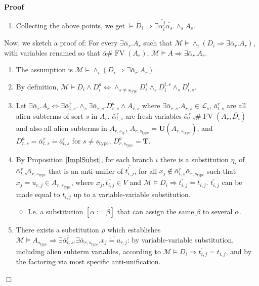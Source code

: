 \documentclass{article}
\newcommand{\assign}{:=}
\newcommand{\nin}{\not\in}
\newcommand{\tmmathbf}[1]{\ensuremath{\boldsymbol{#1}}}
\newcommand{\tmop}[1]{\ensuremath{\operatorname{#1}}}
\newenvironment{proof}{\noindent\textbf{Proof\ }}{\hspace*{\fill}$\Box$\medskip}
\begin{document}
\begin{proof}
\begin{enumerate}
    \item Collecting the above points, we get $\vDash D_i \Rightarrow \exists
    \overline{\alpha^j_i} \overline{\bar{\alpha}_s} . \wedge_s A_s$.
  \end{enumerate}
  Now, we sketch a proof of: For every $\exists \bar{\alpha}_r .A_r$ such that
  $\mathcal{M} \vDash \wedge_i (D_i \Rightarrow \exists \bar{\alpha}_r .A_r)$,
  with variables renamed so that $\bar{\alpha} \# \tmop{FV} (A_r)$,
  $\mathcal{M} \vDash A \Rightarrow \exists \bar{\alpha}_r .A_r$.
  \begin{enumerate}
    \item The assumption is $\mathcal{M} \vDash \wedge_i (D_i \Rightarrow
    \exists \bar{\alpha}_r .A_r)$.
    
    \item By definition, $\mathcal{M} \vDash D_i \wedge D_i^a \Leftrightarrow
    \wedge_{s \neq s_{\tmop{type}}} D_i^s \wedge_s D_i^{t, s} \wedge_s D^t_{i,
    s}$.
    
    \item Let $\exists \bar{\alpha}_r .A_r \Leftrightarrow \exists
    \overline{\bar{\alpha}_{t, s}^r} . \wedge_s \exists \bar{\alpha}_{r, s}
    .D_{r, s}^a \wedge A_{r, s}$ where $\exists \bar{\alpha}_{r, s} .A_{r, s}
    \in \mathcal{L}_s$, $\bar{a}_{t, s}^r$ are all alien subterms of sort $s$
    in $A_r$, $\bar{\alpha}_{t, s}^r$ are fresh variables $\bar{\alpha}_{t,
    s}^r \# \tmop{FV} (A_r, \overline{D_i})$ and also all alien subterms in
    $A_{r, s_{\tmop{ty}}}$, $A_{r, s_{\tmop{type}}} =\tmmathbf{U} (A_{r,
    s_{\tmop{type}}})$, and $D_{r, s}^a = \bar{\alpha}_{t, s}^r \dot{=}
    \bar{a}_{t, s}^r$ for $s \neq s_{\tmop{type}}$, $D_{r, s_{\tmop{type}}}^a
    =\tmmathbf{T}$.
    
    \item By Proposition \ref{ImplSubst}, for each branch $i$ there is a
    substitution $\eta_i$ of $\overline{\bar{\alpha}_{t, s}^r}
    \bar{\alpha}_{r, s_{\tmop{type}}}$ that is an anti-unifier of
    $\overline{t_{i, j}^{\prime}}$, for all $x_j \nin
    \overline{\bar{\alpha}_{t, s}^r} \bar{\alpha}_{r, s_{\tmop{type}}}$ such
    that $x_j \dot{=} u_{r, j} \in A_{r, s_{\tmop{type}}}$, where $x_j,
    \overline{t_{i, j}} \in V$ and $\mathcal{M} \vDash D_i \Rightarrow
    t^{\prime}_{i, j} \dot{=} t_{i, j}$. $t^{\prime}_{i, j}$ can be made equal
    to $t_{i, j}$ up to a variable-variable substitution.
    \begin{itemize}
      \item I.e. a substitution $[\bar{\alpha} \assign \bar{\beta}]$ that can
      assign the same $\beta$ to several $\alpha$.
    \end{itemize}
    \item There exists a substitution $\rho$ which establishes $\mathcal{M}
    \vDash A_{s_{\tmop{type}}} \Rightarrow \exists \overline{\bar{\alpha}_{t,
    s}^r} . \exists \bar{\alpha}_{r, s_{\tmop{type}}} . \overline{x_j \dot{=}
    u_{r, j}}$: by variable-variable substitution, including alien subterm
    variables, according to $\mathcal{M} \vDash D_i \Rightarrow t^{\prime}_{i,
    j} \dot{=} t_{i, j}$, and by the factoring via most specific
    anti-unification.
    

\end{enumerate}
\end{proof}
\end{document}
